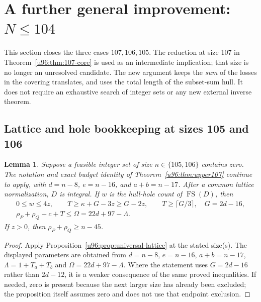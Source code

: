 \documentclass[11pt,a4paper]{article}
\newtheorem{lemma}[theorem]{Lemma}
\theoremstyle{remark}
\newcommand{\FS}{\operatorname{FS}}
\begin{document}
\section{A further general improvement: \texorpdfstring{$N\leq104$}{N at most 104}}\label{u96:sec:upper104}
This section closes the three cases $107,106,105$. The reduction at size
107 in Theorem~\ref{u96:thm:107-core} is used as an intermediate implication;
that size is no longer an unresolved candidate. The new argument keeps the
\emph{sum} of the losses in the covering translates, and uses the total
length of the subset-sum hull. It does not require an exhaustive search of
integer sets or any new external inverse theorem.

\subsection{Lattice and hole bookkeeping at sizes 105 and 106}
\begin{lemma}\label{u96:lem:lower-lattice}
Suppose a feasible integer set of size $n\in\{105,106\}$ contains zero.
The notation and exact budget identity of Theorem~\ref{u96:thm:upper107}
continue to apply, with $d=n-8$, $e=n-16$, and $a+b=n-17$.
After a common lattice normalization, $D$ is integral. If $w$ is the
hull-hole count of $\FS(D)$, then
\begin{gather}
 0\leq w\leq4z,\qquad
 T\geq\kappa+G-3z\geq G-2z,\qquad
 T\geq\lceil G/3\rceil,\quad G=2d-16,\label{u96:eq:lower-holes}\\
 \rho_P+\rho_Q+c+T\leq\Omega=22d+97-\Lambda.\label{u96:eq:lower-budget}
\end{gather}
If $z>0$, then $\rho_P+\rho_Q\geq n-45$.
\end{lemma}
\begin{proof}
Apply Proposition~\ref{u96:prop:universal-lattice} at the stated size(s).
The displayed parameters are obtained from $d=n-8$, $e=n-16$,
$a+b=n-17$, $\Lambda=1+T_a+T_b$ and $\Omega=22d+97-\Lambda$.
Where the statement uses $G=2d-16$ rather than $2d-12$, it is a weaker
consequence of the same proved inequalities. If needed, zero is present
because the next larger size has already been excluded; the proposition
itself assumes zero and does not use that endpoint exclusion.
\end{proof}
\end{document}
